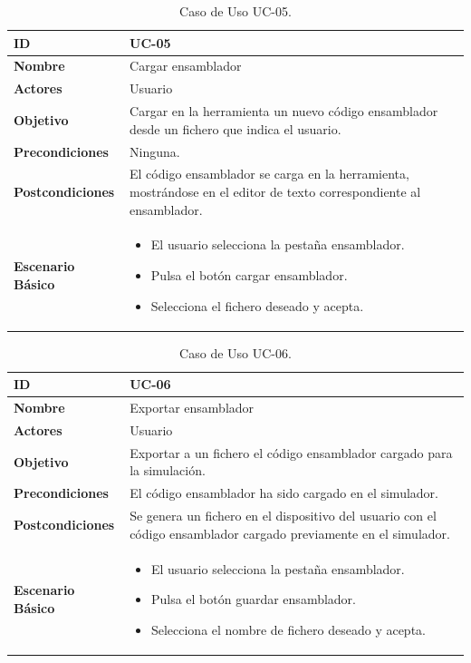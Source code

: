 \begin{center}
\begin{table}[htbp]
\centering
\begin{tabular}{@{}p{2.5cm} p{9cm}@{}} 
\toprule
\textbf{ID}	& UC-05  \\
\midrule
\textbf{Nombre} 		& Cargar ensamblador   \\
\midrule
\textbf{Actores} 		&	Usuario  \\
\midrule
\textbf{Objetivo} 	&	Cargar en la herramienta un nuevo código ensamblador desde un fichero que indica el usuario. 	 \\
\midrule
\textbf{Precondiciones}	&	Ninguna.   \\
\midrule
\textbf{Postcondiciones} 	& El código ensamblador se carga en la herramienta, mostrándose en el editor de texto correspondiente al ensamblador.   \\
\midrule
\textbf{Escenario Básico} 	&  \begin{itemize}
\item El usuario selecciona la pestaña ensamblador.
\item Pulsa el botón cargar ensamblador.
\item Selecciona el fichero deseado y acepta.
\end{itemize} \\
\bottomrule
\end{tabular}
\caption{Caso de Uso UC-05.}
\label{tab:uc05}
\end{table}
\end{center}

\begin{center}
\begin{table}[htbp]
\centering
\begin{tabular}{@{}p{2.5cm} p{9cm}@{}} 
\toprule
\textbf{ID}	& UC-06  \\
\midrule
\textbf{Nombre} 		& Exportar ensamblador   \\
\midrule
\textbf{Actores} 		&	Usuario  \\
\midrule
\textbf{Objetivo} 	&	Exportar a un fichero el código ensamblador cargado para la simulación. 	 \\
\midrule
\textbf{Precondiciones}	&	El código ensamblador ha sido cargado en el simulador.   \\
\midrule
\textbf{Postcondiciones} 	& Se genera un fichero en el dispositivo del usuario con el código ensamblador cargado previamente en el simulador.   \\
\midrule
\textbf{Escenario Básico} 	&  \begin{itemize}
\item El usuario selecciona la pestaña ensamblador.
\item Pulsa el botón guardar ensamblador.
\item Selecciona el nombre de fichero deseado y acepta.
\end{itemize} \\
\bottomrule
\end{tabular}
\caption{Caso de Uso UC-06.}
\label{tab:uc06}
\end{table}
\end{center}

